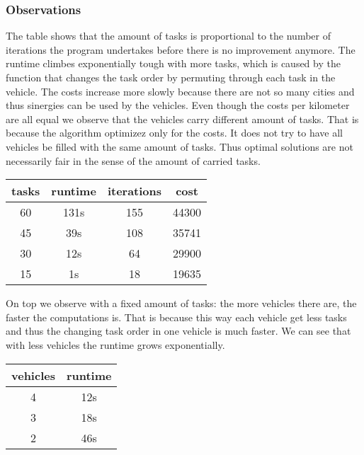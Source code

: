 \documentclass[11pt]{article}
\begin{document}
\subsubsection{Observations}
The table shows that the amount of tasks is proportional to the number of iterations the program undertakes before there is no improvement anymore. The runtime climbes exponentially tough with more tasks, which is caused by the function that changes the task order by permuting through each task in the vehicle. The costs increase more slowly because there are not so many cities and thus sinergies can be used by the vehicles.
Even though the costs per kilometer are all equal we observe that the vehicles carry different amount of tasks. That is because the algorithm optimizez only for the costs. It does not try to have all vehicles be filled with the same amount of tasks. Thus optimal solutions are not necessarily fair in the sense of the amount of carried tasks. 

\begin{center}
\begin{tabular}{ c  |c c c }
 tasks & runtime & iterations&cost  \\ 
\hline
 60 & 131s &155 &44300 \\  
 45 & 39s &108 &35741\\
 30 & 12s &64& 29900\\
 15&1s&18&19635

\end{tabular}
\end{center}


On top we observe with a fixed amount of tasks: the more vehicles there are, the faster the computations is. That is because this way each vehicle get less tasks and thus the changing task order in one vehicle is much faster. We can see that with less vehicles the runtime grows exponentially.
\begin{center}
\begin{tabular}{ c  |c  }
\centering
 vehicles & runtime  \\ 
\hline
 4 & 12s  \\  
 3 & 18s \\
 2 & 46s \\
\end{tabular}
\end{center}
\end{document}
